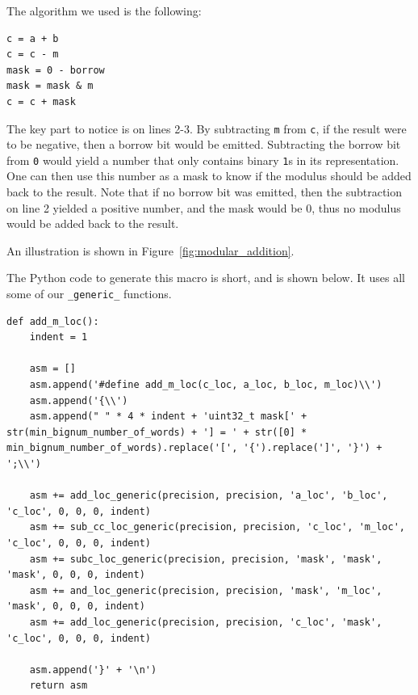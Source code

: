 \documentclass[12pt, a4paper]{report}
\begin{document}
\begin{sloppypar}
The algorithm we used is the following:
\begin{lstlisting}
c = a + b
c = c - m
mask = 0 - borrow
mask = mask & m
c = c + mask
\end{lstlisting}

The key part to notice is on lines 2-3.
By subtracting \verb+m+ from \verb+c+, if the result were to be negative, then
a borrow bit would be emitted.
Subtracting the borrow bit from \verb+0+ would yield a number that only contains
binary \verb+1+s in its representation.
One can then use this number as a mask to know if the modulus should be added
back to the result.
Note that if no borrow bit was emitted, then the subtraction on line 2 yielded a
positive number, and the mask would be 0, thus no modulus would be added back to
the result.

An illustration is shown in Figure~\ref{fig:modular_addition}.

The Python code to generate this macro is short, and is shown below. It uses all
some of our \verb+_generic_+ functions.

\begin{lstlisting}
def add_m_loc():
    indent = 1

    asm = []
    asm.append('#define add_m_loc(c_loc, a_loc, b_loc, m_loc)\\')
    asm.append('{\\')
    asm.append(" " * 4 * indent + 'uint32_t mask[' + str(min_bignum_number_of_words) + '] = ' + str([0] * min_bignum_number_of_words).replace('[', '{').replace(']', '}') + ';\\')

    asm += add_loc_generic(precision, precision, 'a_loc', 'b_loc', 'c_loc', 0, 0, 0, indent)
    asm += sub_cc_loc_generic(precision, precision, 'c_loc', 'm_loc', 'c_loc', 0, 0, 0, indent)
    asm += subc_loc_generic(precision, precision, 'mask', 'mask', 'mask', 0, 0, 0, indent)
    asm += and_loc_generic(precision, precision, 'mask', 'm_loc', 'mask', 0, 0, 0, indent)
    asm += add_loc_generic(precision, precision, 'c_loc', 'mask', 'c_loc', 0, 0, 0, indent)

    asm.append('}' + '\n')
    return asm
\end{lstlisting}


\end{sloppypar}
\end{document}
